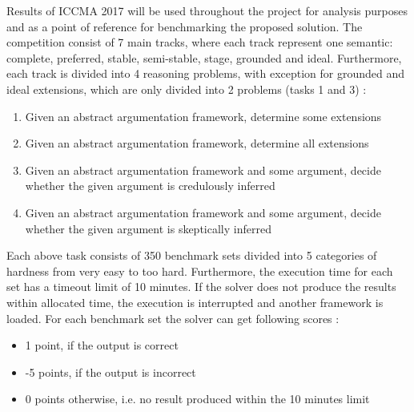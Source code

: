 Results of ICCMA 2017 will be used throughout the project for analysis purposes and as a point of reference for benchmarking the proposed solution. The competition consist of 7 main tracks, where each track represent one semantic: complete, preferred, stable, semi-stable, stage, grounded and ideal. Furthermore, each track is divided into 4 reasoning problems, with exception for grounded and ideal extensions, which are only divided into 2 problems (tasks 1 and 3) \citep{ICCMA2017}:
\begin{enumerate}
	\item{Given an abstract argumentation framework, determine some extensions}
	\item{Given an abstract argumentation framework, determine all extensions}
	\item{Given an abstract argumentation framework and some argument, decide whether the given argument is credulously inferred}
	\item{Given an abstract argumentation framework and some argument, decide whether the given argument is skeptically inferred}
\end{enumerate}
Each above task consists of 350 benchmark sets divided into 5 categories of hardness from very easy to too hard. Furthermore, the execution time for each set has a timeout limit of 10 minutes. If the solver does not produce the results within allocated time, the execution is interrupted and another framework is loaded. For each benchmark set the solver can get following scores \citep{results_sildes}:
\begin{itemize}
	\item{1 point, if the output is correct}
	\item{-5 points, if the output is incorrect}
	\item{0 points otherwise, i.e. no result produced within the 10 minutes limit}
\end{itemize}


